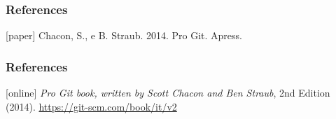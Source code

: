 
\begin{frame}
    \frametitle{References}
    \addtocounter{nframe}{1}
    \begin{thebibliography}{10}
        [paper]
        \tiny{} Chacon, S., e B. Straub. 2014. Pro Git. Apress. 
    \end{thebibliography}

\end{frame}

\begin{frame}
    \frametitle{References}
    \addtocounter{nframe}{1}
    \begin{thebibliography}{10}
        
        [online]
        \tiny{} \textit{Pro Git book, written by Scott Chacon and Ben Straub}, 2nd Edition (2014). \url{https://git-scm.com/book/it/v2}
    \end{thebibliography}

\end{frame}